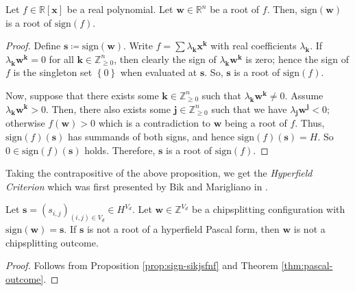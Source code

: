 \begin{proposition}\label{prop:sign-sikjsfnf}
    Let \( f \in \mathbb{R}[\mathbf{x}] \) be a real polynomial. Let \( \mathbf{w} \in \mathbb{R}^n \) be a root of \( f \). Then, \( \mathrm{sign}(\mathbf{w}) \) is a root of \( \mathrm{sign}(f) \).
\end{proposition}

\begin{proof}
    Define \( \mathbf{s} \coloneqq \mathrm{sign}(\mathbf{w}) \). Write \( f = \sum \lambda_{\mathbf{k}} \mathbf{x}^{\mathbf{k}} \) with real coefficients \( \lambda_{\mathbf{k}} \). If \( \lambda_{\mathbf{k}} \mathbf{w}^{\mathbf{k}} = 0 \) for all \( \mathbf{k} \in \mathbb{Z}^n_{\geq 0} \), then clearly the sign of \( \lambda_{\mathbf{k}} \mathbf{w}^{\mathbf{k}} \) is zero; hence the sign of \( f \) is the singleton set \( \left\{ 0 \right\} \) when evaluated at \( \mathbf{s} \). So, \( \mathbf{s} \) is a root of \( \mathrm{sign}(f) \).

    Now, suppose that there exists some \( \mathbf{k} \in \mathbb{Z}^n_{\geq 0} \) such that \( \lambda_{\mathbf{k}} \mathbf{w}^{\mathbf{k}} \neq 0 \). Assume \(  \lambda_{\mathbf{k}} \mathbf{w}^{\mathbf{k}} > 0 \). Then, there also exists some \( \mathbf{j} \in \mathbb{Z}^n_{\geq 0} \) such that we have \( \lambda_{\mathbf{j}} \mathbf{w}^{\mathbf{j}} < 0 \); otherwise \( f(\mathbf{w}) > 0 \) which is a contradiction to \( \mathbf{w} \) being a root of \( f \). Thus, \( \mathrm{sign}(f)(\mathbf{s}) \) has summands of both signs, and hence \( \mathrm{sign}(f)(\mathbf{s}) = H \). So \( 0 \in  \mathrm{sign}(f)(\mathbf{s}) \) holds. Therefore, \( \mathbf{s} \) is a root of \( \mathrm{sign}(f) \).
\end{proof}

Taking the contrapositive of the above proposition, we get the \emph{Hyperfield Criterion} which was first presented by Bik and Marigliano in \cite{bik2022classifying}.

\begin{proposition}
    Let \( \mathbf{s} = (s_{i,j})_{(i,j) \in V_d} \in H^{V_d} \). Let \( \mathbf{w} \in \mathbb{Z}^{V_d} \) be a chipsplitting configuration with \( \mathrm{sign}(\mathbf{w}) = \mathbf{s} \). If \( \mathbf{s} \) is not a root of a hyperfield Pascal form, then \( \mathbf{w} \) is not a chipsplitting outcome.
\end{proposition}

\begin{proof}
    Follows from Proposition \ref{prop:sign-sikjsfnf} and Theorem \ref{thm:pascal-outcome}.
\end{proof}

